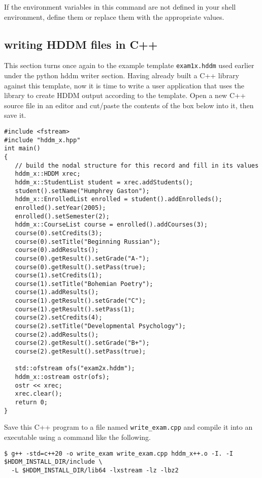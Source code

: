 \documentclass{revtex4}
\begin{document}
If the environment variables in this command are not defined in your shell
environment, define them or replace them with the appropriate values.

\subsection{writing HDDM files in C++}

This section turns once again to the example template \texttt{exam1x.hddm} used
earlier under the python hddm writer section. Having already built a C++ library
against this template, now it is time to write a user application that uses the
library to create HDDM output according to the template. Open a new C++ source
file in an editor and cut/paste the contents of the box below into it, then save it.

\vspace{0.5cm}
\begin{minipage}{12cm}
\begin{verbatim}
#include <fstream>
#include "hddm_x.hpp"
int main()
{
   // build the nodal structure for this record and fill in its values
   hddm_x::HDDM xrec;
   hddm_x::StudentList student = xrec.addStudents();
   student().setName("Humphrey Gaston");
   hddm_x::EnrolledList enrolled = student().addEnrolleds();
   enrolled().setYear(2005);
   enrolled().setSemester(2);
   hddm_x::CourseList course = enrolled().addCourses(3);
   course(0).setCredits(3);
   course(0).setTitle("Beginning Russian");
   course(0).addResults();
   course(0).getResult().setGrade("A-");
   course(0).getResult().setPass(true);
   course(1).setCredits(1);
   course(1).setTitle("Bohemian Poetry");
   course(1).addResults();
   course(1).getResult().setGrade("C");
   course(1).getResult().setPass(1);
   course(2).setCredits(4);
   course(2).setTitle("Developmental Psychology");
   course(2).addResults();
   course(2).getResult().setGrade("B+");
   course(2).getResult().setPass(true);

   std::ofstream ofs("exam2x.hddm");
   hddm_x::ostream ostr(ofs);
   ostr << xrec;
   xrec.clear();
   return 0;
}
\end{verbatim}
\end{minipage}
\vspace{0.5cm}

Save this C++ program to a file named \texttt{write\_exam.cpp} and compile it 
into an executable using a command like the following.

\vspace{0.5cm}
\begin{minipage}{12cm}
\begin{verbatim}
$ g++ -std=c++20 -o write_exam write_exam.cpp hddm_x++.o -I. -I $HDDM_INSTALL_DIR/include \
  -L $HDDM_INSTALL_DIR/lib64 -lxstream -lz -lbz2
\end{verbatim}
\end{minipage}
\vspace{0.5cm}
\end{document}
